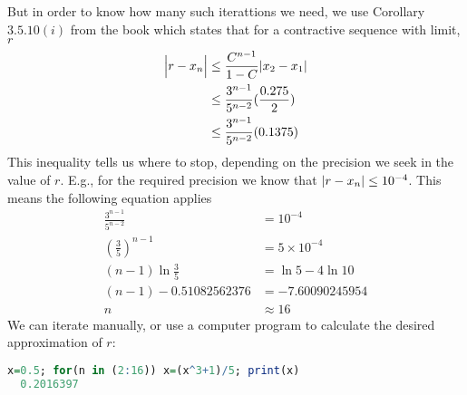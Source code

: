 \documentclass[boxes, qed]{homework}
\DeclarePairedDelimiter\abs{\lvert}{\rvert}
\begin{document}
\begin{solution}
  But in order to know how many such iterattions we need, we use Corollary $3.5.10(i)$
  from the book which states that for a contractive sequence with limit, $r$
  \begin{align*}
    \abs[\Big]{r-x_n} 
      &\le \frac{C^{n-1}}{1-C} \abs[Big]{x_2-x_1}\\
      &\le \frac{3^{n-1}}{5^{n-2}} (\frac{0.275}{2})\\
      &\le \frac{3^{n-1}}{5^{n-2}} (0.1375)
  \end{align*}
  This inequality tells  us where to stop, depending on the precision we seek in the value
  of $r$. E.g., for the required precision we know that $\abs{r-x_n} \le 10^{-4}$. 
  This means the following equation applies
  \begin{align*}
    \frac{3^{n-1}}{5^{n-2}} &= 10^{-4}\\
    (\frac{3}{5})^{n-1} &= 5 \times 10^{-4}\\
    (n-1)\ln{\frac{3}{5}} &= \ln{5} -4 \ln{10}\\
    (n-1) -0.51082562376 &= -7.60090245954\\
    n &\approx 16
  \end{align*}
  We can iterate manually, or use a computer program to calculate 
  the desired approximation of $r$:
  \begin{lstlisting}[backgroundcolor = \color{lightgray},language = R]
  x=0.5; for(n in (2:16)) x=(x^3+1)/5; print(x)
  0.2016397
  \end{lstlisting}
\end{solution}
\end{document}
